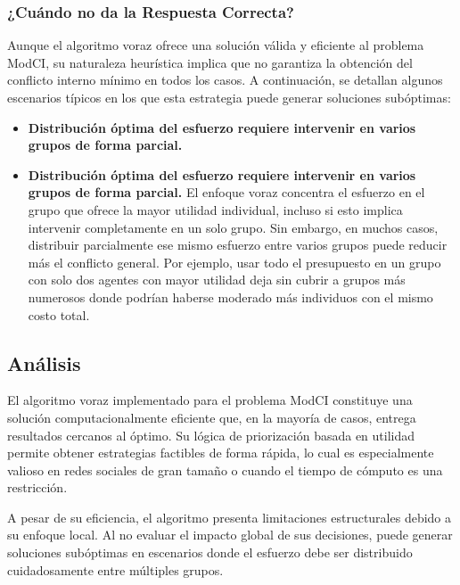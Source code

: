 \documentclass[11pt,letter]{article}
\begin{document}
        \subsubsection{¿Cuándo no da la Respuesta Correcta?}


    Aunque el algoritmo voraz ofrece una solución válida y eficiente al problema ModCI, su naturaleza heurística implica que no garantiza la obtención del conflicto interno mínimo en todos los casos. A continuación, se detallan algunos escenarios típicos en los que esta estrategia puede generar soluciones subóptimas:




    \begin{itemize}

    \item \textbf{Distribución óptima del esfuerzo requiere intervenir en varios grupos de forma parcial.}

    \item \textbf{Distribución óptima del esfuerzo requiere intervenir en varios grupos de forma parcial.}
    El enfoque voraz concentra el esfuerzo en el grupo que ofrece la mayor utilidad individual, incluso si esto implica intervenir completamente en un solo grupo. Sin embargo, en muchos casos, distribuir parcialmente ese mismo esfuerzo entre varios grupos puede reducir más el conflicto general. Por ejemplo, usar todo el presupuesto en un grupo con solo dos agentes con mayor utilidad deja sin cubrir a grupos más numerosos donde podrían haberse moderado más individuos con el mismo costo total.


    \end{itemize}








    \subsection{Análisis}
    El algoritmo voraz implementado para el problema ModCI constituye una solución computacionalmente eficiente que, en la mayoría de casos, entrega resultados cercanos al óptimo. Su lógica de priorización basada en utilidad permite obtener estrategias factibles de forma rápida, lo cual es especialmente valioso en redes sociales de gran tamaño o cuando el tiempo de cómputo es una restricción.


    A pesar de su eficiencia, el algoritmo presenta limitaciones estructurales debido a su enfoque local. Al no evaluar el impacto global de sus decisiones, puede generar soluciones subóptimas en escenarios donde el esfuerzo debe ser distribuido cuidadosamente entre múltiples grupos.
\end{document}
